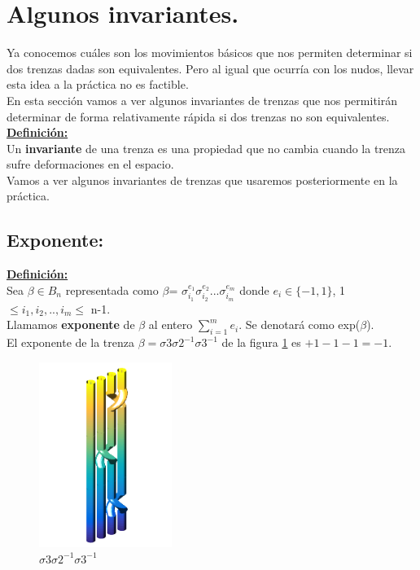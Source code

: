 \bigskip
\section{Algunos invariantes.}
Ya conocemos cuáles son los movimientos básicos que nos permiten determinar si dos trenzas dadas son equivalentes. Pero al igual que ocurría con los nudos, llevar esta idea a la práctica no es factible.\\

En esta sección vamos a ver algunos invariantes de trenzas que nos permitirán determinar de forma relativamente rápida si dos trenzas no son equivalentes.\\

\underline{\textbf{Definición:}} \\
Un \textbf{invariante} de una trenza es una propiedad que no cambia cuando la trenza sufre deformaciones en el espacio. \\

Vamos a ver algunos invariantes de trenzas que usaremos posteriormente en la práctica.

\bigskip
\subsection{Exponente:}\label{invtren1}
\textbf{\underline{Definición:}}\\
Sea $\beta \in B_{n}$ representada como $\beta $= $\sigma_{i_{1}}^{e_{1}} \sigma_{i_{2}}^{e_{2}} ... \sigma_{i_{m}}^{e_{m}}$ donde $e_{i} \in \{-1,1\}$, 1 $\le i_{1}, i_{2},..,i_{m} \le$ n-1.\\
Llamamos \textbf{exponente} de $\beta$ al entero $ \sum_{i=1}^{m} e_{i} $. Se denotará como exp($\beta$).\\

El exponente de la trenza $\beta = \sigma3\sigma2^{-1}\sigma3^{-1}$ de la figura \ref{exp1} es $+1-1-1=-1$.\\
   \begin{figure}[h!]
   	\centering
   	\includegraphics[width=4.3cm]{itrenzas/4c3.png}
   	\caption{$\sigma3\sigma2^{-1}\sigma3^{-1}$}
   	\label{exp1} 
   \end{figure}

